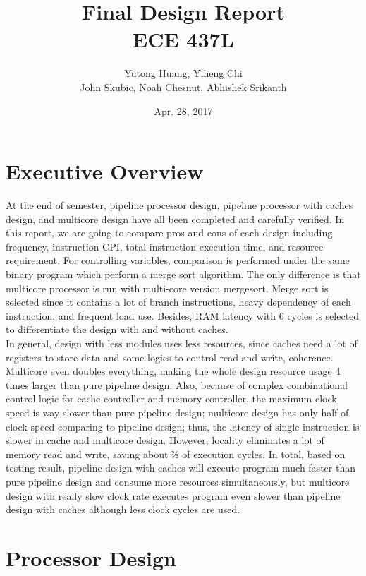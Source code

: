 \documentclass[12pt]{article}
\title{Final Design Report \\
	ECE 437L}
\author{Yutong Huang, Yiheng Chi \\
        John Skubic, Noah Chesnut, Abhishek Srikanth}
\date{Apr. 28, 2017}
\begin{document}
  \maketitle

  \newpage
  \section{Executive Overview}

  At the end of semester, pipeline processor design, pipeline processor with caches design, and multicore design have all been completed and carefully verified. In this report, we are going to compare pros and cons of each design including frequency, instruction CPI, total instruction execution time, and resource requirement. For controlling variables, comparison is performed under the same binary program which perform a merge sort algorithm. The only difference is that multicore processor is run with multi-core version mergesort. Merge sort is selected since it contains a lot of branch instructions, heavy dependency of each instruction, and frequent load use. Besides, RAM latency with 6 cycles is selected to differentiate the design with and without caches. \\
  In general, design with less modules uses less resources, since caches need a lot of registers to store data and some logics to control read and write, coherence. Multicore even doubles everything, making the whole design resource usage 4 times larger than pure pipeline design. Also, because of complex combinational control logic for cache controller and memory controller, the maximum clock speed is way slower than pure pipeline design; multicore design has only half of clock speed comparing to pipeline design; thus, the latency of single instruction is slower in cache and multicore design. However, locality eliminates a lot of memory read and write, saving about ⅔ of execution cycles. In total, based on testing result, pipeline design with caches will execute program much faster than pure pipeline design and consume more resources simultaneously, but multicore design with really slow clock rate executes program even slower than pipeline design with caches although less clock cycles are used.

  \newpage
  \section{Processor Design}
\end{document}
